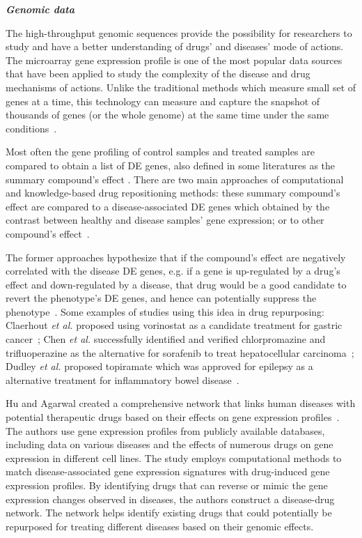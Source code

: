 \documentclass[Minh_PhD_thesis.tex]{subfiles}
\begin{document}
\textit{\textbf{Genomic data}}

The high-throughput genomic sequences provide the possibility for researchers to study and have a better understanding of drugs' and diseases' mode of actions. 
The microarray gene expression profile is one of the most popular data sources that have been applied to study the complexity of the disease and drug mechanisms of actions. Unlike the traditional methods which measure small set of genes at a time, this technology can measure and capture the snapshot of thousands of genes (or the whole genome) at the same time under the same conditions~\cite{slonim2009getting}. 

Most often the gene profiling of control samples and treated samples are compared to obtain a list of DE genes, also defined in some literatures as the summary compound's effect \cite{shaw2003transcriptional}. 
There are two main approaches of computational and knowledge-based drug repositioning methods: these summary compound's effect are compared to a disease-associated DE genes which obtained by the contrast between healthy and disease samples' gene expression; or to other compound's effect~\cite{iorio2013transcriptional}. 

The former approaches hypothesize that if the compound's effect are negatively correlated with the disease DE genes, e.g. if a gene is up-regulated by a drug's effect and down-regulated by a disease, that drug would be a good candidate to revert the phenotype's DE genes, and hence can potentially suppress the phenotype~\cite{sirota2011discovery, mcart2011identification}. Some examples of studies using this idea in drug repurposing: Claerhout \textit{et al.} proposed using vorinostat as a candidate treatment for gastric cancer~\cite{claerhout2011gene}; Chen \textit{et al.} successfully identified and verified chlorpromazine and trifluoperazine as the alternative for sorafenib to treat hepatocellular carcinoma~\cite{chen2011gene}; Dudley \textit{et al.} proposed topiramate which was approved for epilepsy as a alternative treatment for inflammatory bowel disease~\cite{dudley2011computational}. 

Hu and Agarwal created a comprehensive network that links human diseases with potential therapeutic drugs based on their effects on gene expression profiles~\cite{hu2009human}.
The authors use gene expression profiles from publicly available databases, including data on various diseases and the effects of numerous drugs on gene expression in different cell lines.
The study employs computational methods to match disease-associated gene expression signatures with drug-induced gene expression profiles.
By identifying drugs that can reverse or mimic the gene expression changes observed in diseases, the authors construct a disease-drug network.
The network helps identify existing drugs that could potentially be repurposed for treating different diseases based on their genomic effects.
\end{document}
